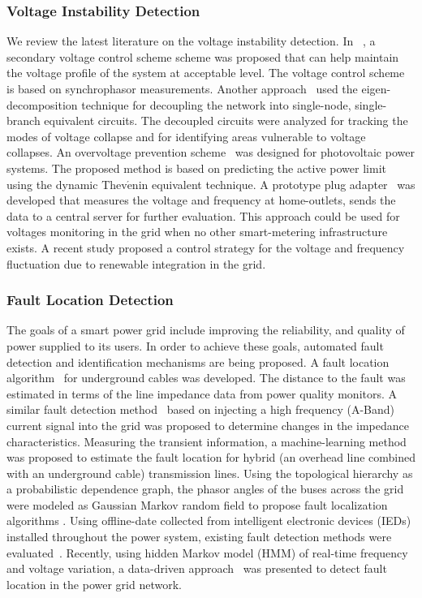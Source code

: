 \subsubsection{Voltage Instability Detection}
We review the latest literature on the voltage instability detection. In ~\cite{su2013adaptive}, a secondary voltage control scheme scheme was proposed that can help maintain the voltage profile of the system at acceptable level. The voltage control scheme is based on synchrophasor measurements. Another approach~\cite{xu2012network} used the eigen-decomposition technique for decoupling the network into single-node, single-branch equivalent circuits. The decoupled circuits were analyzed for tracking the modes of voltage collapse and for identifying areas vulnerable to voltage collapses. An overvoltage prevention scheme~\cite{wang2012online} was designed for photovoltaic power systems. The proposed method is based on predicting the active power limit using the dynamic Thev$\acute{\mathrm{e}}$nin equivalent technique. A prototype plug adapter~\cite{dimitriou2014voltage} was developed that measures the voltage and frequency at home-outlets, sends the data to a central server for further evaluation. This approach could be used for voltages monitoring in the grid when no other smart-metering infrastructure exists. A recent study \cite{chen2015mitigating} proposed a control strategy for the voltage and frequency fluctuation due to renewable integration in the grid.

\subsubsection{Fault Location Detection}
The goals of a smart power grid include improving the reliability, and quality of power supplied to its users. In order to achieve these goals, automated fault detection and identification mechanisms are being proposed. A fault location algorithm~\cite{kulkarni2014incipient} for underground cables was developed. The distance to the fault was estimated in terms of the line impedance data from power quality monitors. A similar fault detection method~\cite{pasdar2013detecting} based on injecting a high frequency (A-Band) current signal into the grid was proposed to determine changes in the impedance characteristics. Measuring the transient information, a machine-learning method \cite{livani2014machine} was proposed to estimate the fault location for hybrid (an overhead line combined with an underground cable) transmission lines. Using the topological hierarchy as a probabilistic dependence graph, the phasor angles of the buses across the grid were modeled as Gaussian Markov random field to propose fault localization algorithms \cite{he2010fault, he2011dependency}. Using offline-date collected from intelligent electronic devices (IEDs) installed throughout the power system, existing fault detection methods were evaluated~\cite{manikandan2011smart}. Recently, using hidden Markov model (HMM) of real-time frequency and voltage variation, a data-driven approach~\cite{jiang2014fault} was presented to detect fault location in the power grid network.

